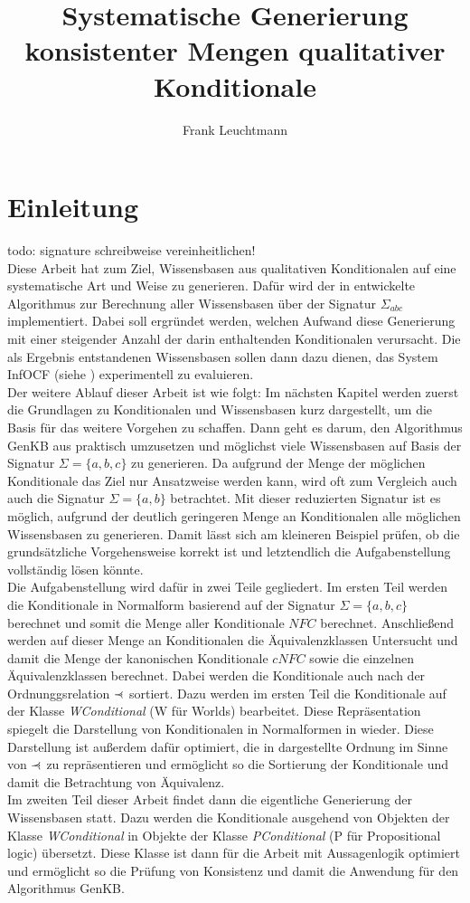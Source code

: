 \documentclass[12pt,a4paper]{article}
\author{Frank Leuchtmann}
\title{Systematische Generierung konsistenter Mengen qualitativer
Konditionale}
\newcommand\rdotl{\mathrel{%
    \mathchoice{\RQEQ}{\RQEQ}{\RQEQ}{\RQEQ}%
}}
\def\RQEQ{{%
    \setbox0\hbox{$\prec$}%
    \rlap{\hbox to \wd0{\hss \raisebox {0.01pt}{$\ \cdot$\hss}}}\box0
}}
\begin{document}
\maketitle
\newpage
\tableofcontents
\newpage
\section{Einleitung}
todo: signature schreibweise vereinheitlichen! \\
Diese Arbeit hat zum Ziel, Wissensbasen aus qualitativen Konditionalen auf eine systematische Art und Weise zu generieren. Dafür wird der in \cite{beierle19} entwickelte Algorithmus zur Berechnung aller Wissensbasen über der Signatur $\Sigma_{abc}$ implementiert. Dabei soll ergründet werden, welchen Aufwand diese Generierung mit einer steigender Anzahl der darin  enthaltenden Konditionalen verursacht. Die als Ergebnis entstandenen Wissensbasen sollen dann dazu dienen, das System InfOCF (siehe \cite{beierle17}) experimentell zu evaluieren. \\
Der weitere Ablauf dieser Arbeit ist wie folgt: Im nächsten Kapitel werden zuerst die Grundlagen zu Konditionalen und Wissensbasen kurz dargestellt, um die Basis für das weitere Vorgehen zu schaffen. Dann geht es darum, den Algorithmus GenKB aus \cite{beierle19} praktisch umzusetzen und möglichst viele Wissensbasen auf Basis der Signatur $\Sigma=\{a,b,c\}$ zu generieren. Da aufgrund der Menge der möglichen Konditionale das Ziel nur Ansatzweise werden kann, wird oft zum Vergleich auch auch die Signatur $\Sigma=\{a,b\}$ betrachtet. Mit dieser reduzierten Signatur ist es möglich, aufgrund der deutlich geringeren Menge an Konditionalen alle möglichen Wissensbasen zu generieren. Damit lässt sich am kleineren Beispiel prüfen, ob die grundsätzliche Vorgehensweise korrekt ist und letztendlich die Aufgabenstellung vollständig lösen könnte. \\
Die Aufgabenstellung wird dafür in zwei Teile gegliedert. Im ersten Teil werden die Konditionale in Normalform basierend auf der Signatur $\Sigma=\{a,b,c\}$ berechnet und somit die Menge aller Konditionale $NFC$  berechnet. Anschließend werden auf dieser Menge an Konditionalen die Äquivalenzklassen Untersucht und damit die Menge der kanonischen Konditionale $cNFC$ sowie die einzelnen Äquivalenzklassen berechnet. Dabei werden die Konditionale auch nach der Ordnunggsrelation $\rdotl$ sortiert. Dazu werden im ersten Teil die Konditionale auf der Klasse \textit{WConditional} (W für Worlds) bearbeitet. Diese Repräsentation spiegelt die Darstellung von Konditionalen in Normalformen in \cite{beierle19} wieder. Diese Darstellung ist außerdem dafür optimiert, die in \cite{beierle19} dargestellte Ordnung im Sinne von $\rdotl$ zu repräsentieren und ermöglicht so die Sortierung der Konditionale und damit die Betrachtung von Äquivalenz. \\
Im zweiten Teil dieser Arbeit findet dann die eigentliche Generierung der Wissensbasen statt. Dazu werden die Konditionale ausgehend von Objekten der Klasse \textit{WConditional} in Objekte der Klasse \textit{PConditional} (P für Propositional logic) übersetzt. Diese Klasse ist dann für die Arbeit mit Aussagenlogik optimiert und ermöglicht so die Prüfung von Konsistenz und damit die Anwendung für den Algorithmus GenKB.
\end{document}
